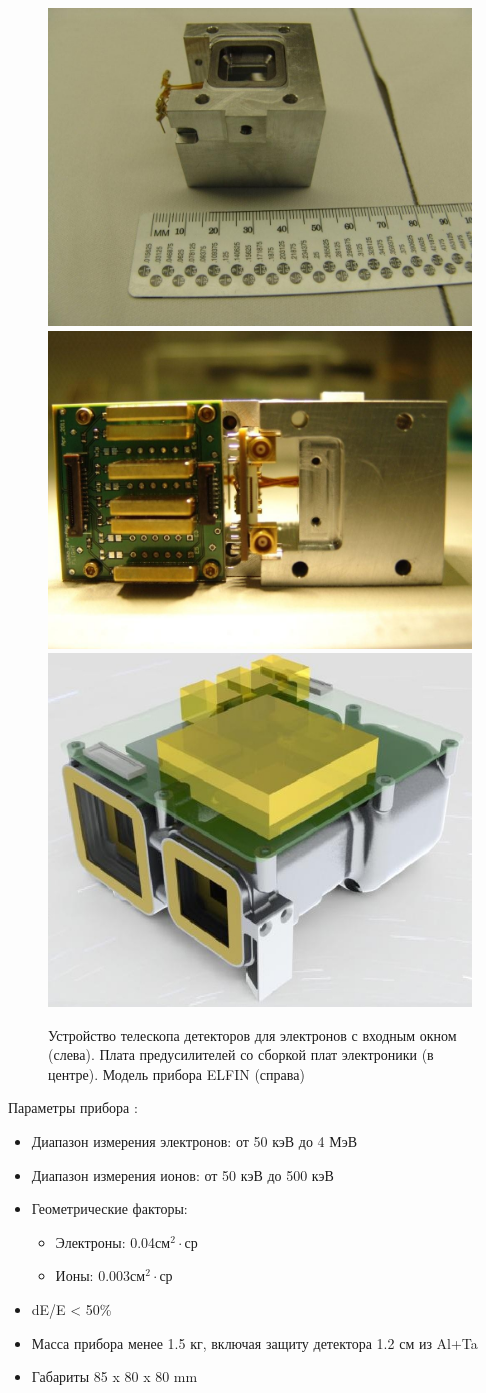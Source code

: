 \begin{figure}
	\centering
	\includegraphics[width=0.33\linewidth]{images/elfin/DSC04260}
	\includegraphics[width=0.33\linewidth]{images/elfin/DSC04287}
	\includegraphics[width=0.32\linewidth]{images/EPD_Brochure}
	\caption{Устройство телескопа детекторов для электронов с входным окном (слева). 	Плата предусилителей со сборкой плат электроники (в центре). Модель прибора ELFIN (справа)}
	\label{fig:dsc04260}
\end{figure}


Параметры прибора :
\begin{itemize}
	\item Диапазон измерения электронов: от 50 кэВ до 4 МэВ
	
	\item Диапазон измерения ионов: от 50 кэВ до 500 кэВ
	
	\item Геометрические факторы:
	
	\begin{itemize}
		\item Электроны: 0.04см$ ^{2}\cdot $ср
		
		\item Ионы: 0.003см$ ^{2}\cdot $ср
	\end{itemize}
	
	
	\item dE/E < 50\%
	
	\item Масса прибора менее 1.5 кг, включая защиту детектора 1.2 см из Al+Ta
	
	\item Габариты 85 x 80 x 80 mm
\end{itemize}

